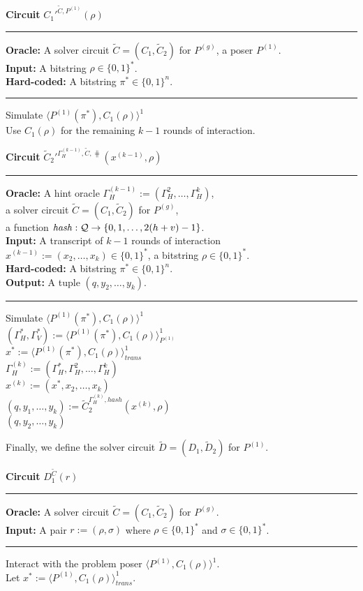 \begin{codeblock}
  \textbf{Circuit} $C_1'^{\widetilde{C}, P^{(1)}}(\rho)$
  \medskip \hrule
  \textbf{Oracle:} A solver circuit $\widetilde{C} = (C_1, \widetilde{C}_2)$ for $P^{(g)}$, a poser $P^{(1)}$. \\
  \textbf{Input:}  A bitstring $\rho \in \{0,1\}^{*}$. \\
  \textbf{Hard-coded:} A bitstring $\pi^* \in \{0,1\}^{n}$.
  \medskip\hrule
  Simulate $\langle P^{(1)}(\pi^*), C_1(\rho)\rangle^1$ \\
  Use $C_1(\rho)$ for the remaining $k-1$ rounds of interaction.
\end{codeblock}
%
\begin{codeblock}
  \textbf{Circuit} $\widetilde{C}_2'^{\Gamma_H^{(k-1)}, \widetilde{C}, \hash}(x^{(k-1)}, \rho)$
  \medskip \hrule
  \textbf{Oracle:} A hint oracle $\Gamma_H^{(k-1)} := (\Gamma_H^{2}, \dots, \Gamma_H^{k})$,\\
  \IndII a solver circuit $\widetilde{C} = (C_1, \widetilde{C}_2)$ for $P^{(g)}$, \\
  \IndII a function $\operatorname{\mathit{hash}}: \mathcal{Q} \rightarrow \{0,1,\dots, 2(h+v)-1\}$. \\
  \textbf{Input:}  A transcript of $k-1$ rounds of interaction \\
  \IndII $x^{(k-1)} := (x_2, \dotsc, x_{k}) \in \{0,1\}^{*}$, a bitstring $\rho \in \{0,1\}^{*}$.\\
  \textbf{Hard-coded:} A bitstring $\pi^* \in \{0,1\}^{n}$. \\
  \textbf{Output:} A tuple $(q, y_2, \dots, y_k)$.
  \medskip\hrule
  Simulate $\langle P^{(1)}(\pi^*), C_1(\rho) \rangle^{1}$ \\
  \IndI $(\Gamma_H^*, \Gamma_V^*) := \langle P^{(1)}(\pi^*), C_1(\rho) \rangle^{1}_{P^{(1)}}$ \\
  \IndI $x^* := \langle P^{(1)}(\pi^*), C_1(\rho) \rangle^{1}_{\mathit{trans}}$ \\
  $\Gamma_H^{(k)} := (\Gamma_H^*, \Gamma_H^{2}, \dots, \Gamma_H^{k})$ \\
  $x^{(k)} := (x^*, x_2, \dots, x_{k})$ \\
  $(q, y_1, \dots, y_k) := \widetilde{C}_2^{\Gamma_H^{(k)}, \mathit{hash}}(x^{(k)}, \rho)$ \\
  \Return $(q, y_2, \dots, y_k)$
\end{codeblock}
%
Finally, we define the solver circuit $\widetilde{D} = (D_1, \widetilde{D}_2)$ for $P^{(1)}$.
%
\begin{codeblock}
  \textbf{Circuit} $D_1^{\widetilde{C}}(r)$
  \medskip \hrule
  \textbf{Oracle:} A solver circuit $\widetilde{C} = (C_1, \widetilde{C}_2)$ for $P^{(g)}$.\\
  \textbf{Input:} A pair $r := (\rho, \sigma)$ where $ \rho \in \{0,1\}^{*}$ and $\sigma \in \{0,1\}^{*}$.
  \medskip\hrule
  Interact with the problem poser $\langle P^{(1)}, C_1(\rho) \rangle^1$. \\
  Let $x^* := \langle P^{(1)}, C_1(\rho) \rangle^1_{\mathit{trans}}$.
\end{codeblock}
